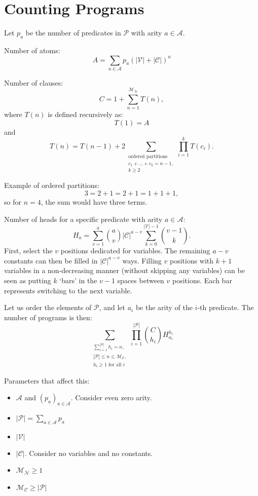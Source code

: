\documentclass[runningheads]{llncs}
\newcommand{\predicates}{\mathcal{P}}
\newcommand{\variables}{\mathcal{V}}
\newcommand{\constants}{\mathcal{C}}
\newcommand{\arities}{\mathcal{A}}
\newcommand{\maxNumNodes}{\mathcal{M}_{\mathcal{N}}}
\newcommand{\maxNumClauses}{\mathcal{M}_{\mathcal{C}}}
\begin{document}
\section{Counting Programs}

Let $p_a$ be the number of predicates in $\predicates{}$ with arity $a \in
\arities{}$.

Number of atoms:
\[
  A = \sum_{a \in \arities{}} p_a(|\variables{}| + |\constants{}|)^a
\]

Number of clauses:
\[
  C = 1 + \sum_{n=1}^{\maxNumNodes{}} T(n),
\]
where $T(n)$ is defined recursively as:
\[
  T(1) = A
\]
and
\[
  T(n) = T(n-1) + 2\sum_{\substack{\text{ordered partitions}\\
      c_1 + \dots + c_k = n - 1,\\
      k \ge 2}} \prod_{i=1}^k T(c_i).
\]

Example of ordered partitions:
\[
  3 = 2 + 1 = 2 + 1 = 1 + 1 + 1,
\]
so for $n=4$, the sum would have three terms.

Number of heads for a specific predicate with arity $a \in \arities{}$:
\[
  H_a = \sum_{v=1}^a \binom{a}{v} |\constants{}|^{a-v}
  \sum_{k=0}^{|\variables{}|-1} \binom{v-1}{k}.
\]
First, select the $v$ positions dedicated for variables. The remaining $a-v$
constants can then be filled in $|\constants{}|^{a-v}$ ways. Filling $v$
positions with $k+1$ variables in a non-decreasing manner (without skipping any
variables) can be seen as putting $k$ `bars' in the $v-1$ spaces between $v$
positions. Each bar represents switching to the next variable.

Let us order the elements of $\predicates{}$, and let $a_i$ be the arity of the
$i$-th predicate. The number of programs is then:
\[
  \sum_{\substack{ \sum_{i=1}^{|\predicates{}|} h_i = n,\\
      |\predicates{}| \le n \le \maxNumClauses,\\
      h_i \ge 1 \text{ for all } i}} \prod_{i=1}^{|\predicates{}|}
  \binom{C}{h_i} H_{a_i}^{h_i}
\]

Parameters that affect this:
\begin{itemize}
\item $\arities{}$ and $(p_a)_{a \in \arities{}}$. Consider even zero arity.
\item $|\predicates{}| = \sum_{a \in \arities{}} p_a$
\item $|\variables{}|$
\item $|\constants{}|$. Consider no variables and no constants.
\item $\maxNumNodes{} \ge 1$
\item $\maxNumClauses{} \ge |\predicates{}|$
\end{itemize}
\end{document}
